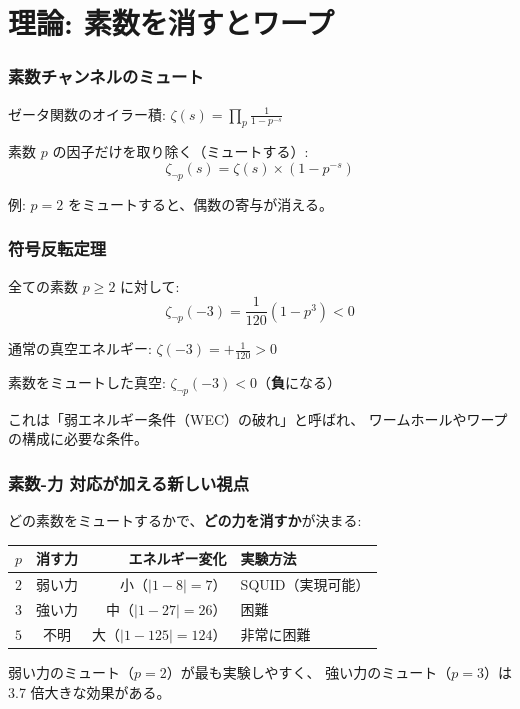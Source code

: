 \documentclass[12pt,a4paper]{article}
\begin{document}
\part{理論: 素数を消すとワープ}

\section{素数チャンネルのミュート}

\begin{mathbox}[素数を「消す」操作]
ゼータ関数のオイラー積: $\zeta(s) = \prod_p \frac{1}{1-p^{-s}}$

素数 $p$ の因子だけを取り除く（ミュートする）:
$$\zeta_{\neg p}(s) = \zeta(s) \times (1 - p^{-s})$$

例: $p=2$ をミュートすると、偶数の寄与が消える。
\end{mathbox}

\section{符号反転定理}

\begin{resultbox}[定理（数学的に証明済み）]
全ての素数 $p \geq 2$ に対して:
$$\zeta_{\neg p}(-3) = \frac{1}{120}(1 - p^3) < 0$$

通常の真空エネルギー: $\zeta(-3) = +\frac{1}{120} > 0$

素数をミュートした真空: $\zeta_{\neg p}(-3) < 0$（\textbf{負}になる）

これは「弱エネルギー条件（WEC）の破れ」と呼ばれ、
ワームホールやワープの構成に必要な条件。
\end{resultbox}

\section{素数-力 対応が加える新しい視点}

\begin{resultbox}
どの素数をミュートするかで、\textbf{どの力を消すか}が決まる:

\begin{center}
\renewcommand{\arraystretch}{1.3}
\begin{tabular}{ccrl}
\toprule
$p$ & 消す力 & エネルギー変化 & 実験方法 \\
\midrule
$2$ & 弱い力 & 小（$|1-8|=7$） & SQUID（実現可能） \\
$3$ & 強い力 & 中（$|1-27|=26$） & 困難 \\
$5$ & 不明 & 大（$|1-125|=124$） & 非常に困難 \\
\bottomrule
\end{tabular}
\end{center}

弱い力のミュート（$p=2$）が最も実験しやすく、
強い力のミュート（$p=3$）は 3.7 倍大きな効果がある。
\end{resultbox}
\end{document}
